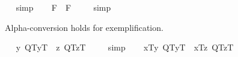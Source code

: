 \begin{isabellebody}
\isadelimproof
\ %
\endisadelimproof
%
\isatagproof
{}\isamarkupfalse%
\ simp\ \isamarkupfalse%
%
\endisatagproof
{\isafoldproof}%
%
\isadelimproof
%
\endisadelimproof
\isanewline
\ \isamarkupfalse%
\ {\isachardoublequoteopen}{\isacharbrackleft}\isactrlbold {\isasymA}{\isasymphi}\isactrlsup F\ \isactrlbold {\isasymrightarrow}\ \isactrlbold {\isasymbox}{\isacharparenleft}\isactrlbold {\isasymA}{\isasymphi}\isactrlsup F{\isacharparenright}{\isacharbrackright}\ {\isacharequal}\ {\isasymtop}{\isachardoublequoteclose}%
\isadelimproof
\ %
\endisadelimproof
%
\isatagproof
{}\isamarkupfalse%
\ simp\ \isamarkupfalse%
%
\endisatagproof
{\isafoldproof}%
%
\isadelimproof
%
\endisadelimproof
%
\isamarkuptrue%
%
\begin{isamarkuptext}%
Alpha-conversion holds for exemplification.%
\end{isamarkuptext}\isamarkuptrue%
\ \isamarkupfalse%
\ {\isachardoublequoteopen}{\isacharbrackleft}{\isacharparenleft}\isactrlbold {\isasymlambda}y{\isachardot}\ \isactrlbold {\isasymnot}{\isasymlparr}Q\isactrlsup T{\isacharcomma}y\isactrlsup T{\isasymrparr}{\isacharparenright}\ \isactrlbold {\isacharequal}\ {\isacharparenleft}\isactrlbold {\isasymlambda}z{\isachardot}\ \isactrlbold {\isasymnot}{\isasymlparr}Q\isactrlsup T{\isacharcomma}z\isactrlsup T{\isasymrparr}{\isacharparenright}{\isacharbrackright}\ {\isacharequal}\ {\isasymtop}{\isachardoublequoteclose}%
\isadelimproof
\ %
\endisadelimproof
%
\isatagproof
{}\isamarkupfalse%
\ simp\ \isamarkupfalse%
%
\endisatagproof
{\isafoldproof}%
%
\isadelimproof
%
\endisadelimproof
\isanewline
\ \isamarkupfalse%
\ {\isachardoublequoteopen}{\isacharbrackleft}{\isasymlbrace}x\isactrlsup T{\isacharcomma}{\isacharparenleft}\isactrlbold {\isasymlambda}y{\isachardot}\ \isactrlbold {\isasymnot}{\isasymlparr}Q\isactrlsup T{\isacharcomma}y\isactrlsup T{\isasymrparr}{\isacharparenright}{\isasymrbrace}\ \isactrlbold {\isasymrightarrow}\ {\isasymlbrace}x\isactrlsup T{\isacharcomma}{\isacharparenleft}\isactrlbold {\isasymlambda}z{\isachardot}\ \isactrlbold {\isasymnot}{\isasymlparr}Q\isactrlsup T{\isacharcomma}z\isactrlsup T{\isasymrparr}{\isacharparenright}{\isasymrbrace}{\isacharbrackright}\ {\isacharequal}\ {\isasymtop}{\isachardoublequoteclose}%
\isadelimproof
\ %
\endisadelimproof
%
\isatagproof
{}\isamarkupfalse%

\end{isabellebody}
